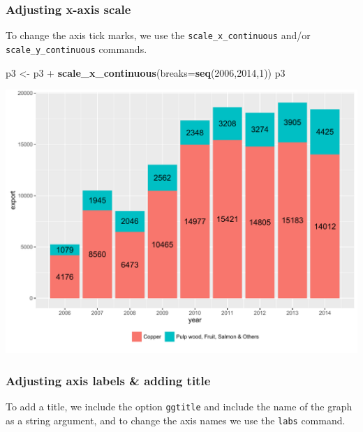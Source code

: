 \documentclass[]{article}
\newenvironment{Shaded}{\begin{snugshade}}{\end{snugshade}}
\newcommand{\KeywordTok}[1]{\textcolor[rgb]{0.13,0.29,0.53}{\textbf{{#1}}}}
\newcommand{\DataTypeTok}[1]{\textcolor[rgb]{0.13,0.29,0.53}{{#1}}}
\newcommand{\DecValTok}[1]{\textcolor[rgb]{0.00,0.00,0.81}{{#1}}}
\newcommand{\StringTok}[1]{\textcolor[rgb]{0.31,0.60,0.02}{{#1}}}
\newcommand{\NormalTok}[1]{{#1}}
\begin{document}
\subsubsection{Adjusting x-axis scale}\label{adjusting-x-axis-scale-2}

To change the axis tick marks, we use the \texttt{scale\_x\_continuous}
and/or \texttt{scale\_y\_continuous} commands.

\begin{Shaded}
\begin{Highlighting}[]
\NormalTok{p3 <-}\StringTok{ }\NormalTok{p3 +}\StringTok{ }\KeywordTok{scale_x_continuous}\NormalTok{(}\DataTypeTok{breaks=}\KeywordTok{seq}\NormalTok{(}\DecValTok{2006}\NormalTok{,}\DecValTok{2014}\NormalTok{,}\DecValTok{1}\NormalTok{))}
\NormalTok{p3}
\end{Highlighting}
\end{Shaded}

\begin{center}\includegraphics{0_all_posts_pdf/bar_6-1} \end{center}

\subsubsection{Adjusting axis labels \& adding
title}\label{adjusting-axis-labels-adding-title-2}

To add a title, we include the option \texttt{ggtitle} and include the
name of the graph as a string argument, and to change the axis names we
use the \texttt{labs} command.

\begin{Shaded}
\end{Shaded}
\end{document}
